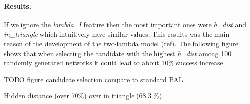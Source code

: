 \paragraph{Results.} 
If we ignore the \emph{lambda\_I} feature then the most important ones were \emph{h\_dist} and \emph{in\_triangle} which intuitively have similar values. This results was the main reason of the development of the two-lambda model (ref). The following figure shows that when selecting the candidate with the highest \emph{h\_dist} among 100 randomly generated networks it could lead to about 10\% success increase. 

TODO figure candidate selection compare to standard BAL 

Hidden distance (over 70\%) over in triangle (68.3 \%). 
